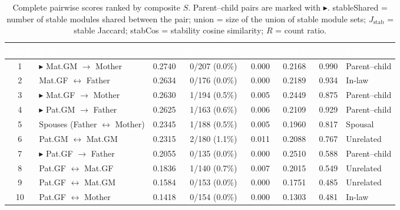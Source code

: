 \documentclass{../yalumba}
\begin{document}
\begin{table}[H]
  \centering
  \tablestyle
  \caption{Complete pairwise scores ranked by composite $S$.
    Parent--child pairs are marked with $\blacktriangleright$.
    stableShared = number of stable modules shared between the pair;
    union = size of the union of stable module sets;
    $J_{\text{stab}}$ = stable Jaccard;
    stabCos = stability cosine similarity;
    $R$ = count ratio.}
  \label{tab:scores}
  \begin{tabular}{clcccccl}
    \toprule
    \rowcolor{table-header}
    \textcolor{white}{\textbf{Rank}} &
    \textcolor{white}{\textbf{Pair}} &
    \textcolor{white}{\textbf{$S$}} &
    \textcolor{white}{\textbf{Shared/Union}} &
    \textcolor{white}{\textbf{$J_{\text{stab}}$}} &
    \textcolor{white}{\textbf{stabCos}} &
    \textcolor{white}{\textbf{$R$}} &
    \textcolor{white}{\textbf{Type}} \\
    \midrule
    1 & $\blacktriangleright$ Mat.GM $\to$ Mother
      & 0.2740 & 0/207 (0.0\%) & 0.000 & 0.2168 & 0.990 & Parent--child \\
    2 & Mat.GF $\leftrightarrow$ Father
      & 0.2634 & 0/176 (0.0\%) & 0.000 & 0.2189 & 0.934 & In-law \\
    3 & $\blacktriangleright$ Mat.GF $\to$ Mother
      & 0.2630 & 1/194 (0.5\%) & 0.005 & 0.2449 & 0.875 & Parent--child \\
    4 & $\blacktriangleright$ Pat.GM $\to$ Father
      & 0.2625 & 1/163 (0.6\%) & 0.006 & 0.2109 & 0.929 & Parent--child \\
    5 & Spouses (Father $\leftrightarrow$ Mother)
      & 0.2345 & 1/188 (0.5\%) & 0.005 & 0.1960 & 0.817 & Spousal \\
    6 & Pat.GM $\leftrightarrow$ Mat.GM
      & 0.2315 & 2/180 (1.1\%) & 0.011 & 0.2088 & 0.767 & Unrelated \\
    7 & $\blacktriangleright$ Pat.GF $\to$ Father
      & 0.2055 & 0/135 (0.0\%) & 0.000 & 0.2510 & 0.588 & Parent--child \\
    8 & Pat.GF $\leftrightarrow$ Mat.GF
      & 0.1836 & 1/140 (0.7\%) & 0.007 & 0.2015 & 0.549 & Unrelated \\
    9 & Pat.GF $\leftrightarrow$ Mat.GM
      & 0.1584 & 0/153 (0.0\%) & 0.000 & 0.1751 & 0.485 & Unrelated \\
    10 & Pat.GF $\leftrightarrow$ Mother
      & 0.1418 & 0/154 (0.0\%) & 0.000 & 0.1303 & 0.481 & In-law \\
    \bottomrule
  \end{tabular}
\end{table}
\end{document}
